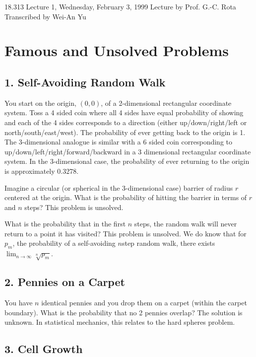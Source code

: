 {\Large 18.313 Lecture 1, Wednesday, February 3, 1999}\newline
{\large Lecture by Prof. G.-C. Rota}\newline
Transcribed by Wei-An Yu\\

\section{Famous and Unsolved Problems}

\subsection{1.  Self-Avoiding Random Walk}

You start on the origin, $(0, 0)$, of a 2-dimensional rectangular coordinate system.  Toss a 4 sided coin where all 4 sides have equal probability of showing and each of the 4 sides corresponds to a direction (either up/down/right/left or north/south/east/west).  The probability of ever getting back to the origin is 1.  The 3-dimensional analogue is similar with a 6 sided coin corresponding to up/down/left/right/forward/backward in a 3 dimensional rectangular coordinate system.  In the 3-dimensional case, the probability of ever returning to the origin is approximately 0.3278.

Imagine a circular (or spherical in the 3-dimensional case) barrier of radius $r$ centered at the origin.  What is the probability of hitting the barrier in terms of $r$ and $n$ steps?  This problem is unsolved.

What is the probability that in the first $n$ steps, the random walk will never return to a point it has visited?  This problem is unsolved.  We do know that for $p_m$, the probability of a self-avoiding $n$step random walk, there exists $\lim_{n \rightarrow \infty} \sqrt[n]{p_m}$.

\subsection{2.  Pennies on a Carpet}

You have $n$ identical pennies and you drop them on a carpet (within the carpet boundary).  What is the probability that no 2 pennies overlap?  The solution is unknown.  In statistical mechanics, this relates to the hard spheres problem.

\subsection{3.  Cell Growth}


